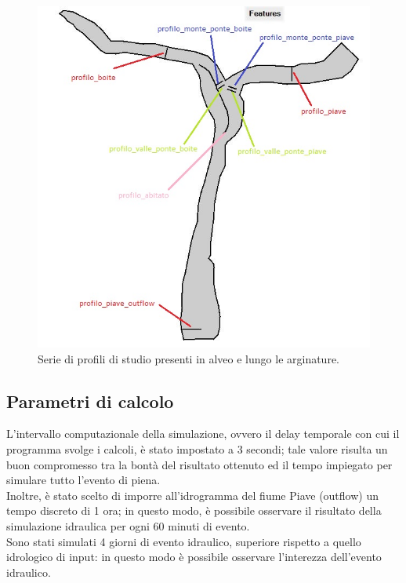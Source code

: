 \begin{figure}[htb] \centering
    \includegraphics[scale=0.7]{immagini/profili.JPG}
    \caption{Serie di profili di studio presenti in alveo e lungo le arginature.}
    \label{figure:profili}
\end{figure}

\subsection{Parametri di calcolo}
L'intervallo computazionale della simulazione, ovvero il delay temporale con cui il programma svolge i calcoli, è stato impostato a 3 secondi; tale valore risulta un buon compromesso tra la bontà del risultato ottenuto ed il tempo impiegato per simulare tutto l'evento di piena.\\
Inoltre, è stato scelto di imporre all'idrogramma del fiume Piave (outflow) un tempo discreto di 1 ora; in questo modo, è possibile osservare il risultato della simulazione idraulica per ogni 60 minuti di evento.\\
Sono stati simulati 4 giorni di evento idraulico, superiore rispetto a quello idrologico di input: in questo modo è possibile osservare l'interezza dell'evento idraulico. 

